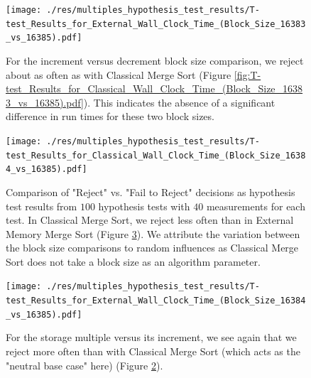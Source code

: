 \documentclass[twocolumn]{article}
\begin{document}
\begin{figure}[htb]
    \begin{minipage}{0.475 \textwidth}
        \centering
        \texttt{[image: ./res/multiples\_hypothesis\_test\_results/T-test\_Results\_for\_External\_Wall\_Clock\_Time\_(Block\_Size\_16383\_vs\_16385).pdf]}
        \caption{For the increment versus decrement block size comparison, we reject about as often as with Classical Merge Sort (Figure \ref{fig:T-test_Results_for_Classical_Wall_Clock_Time_(Block_Size_16383_vs_16385).pdf}). This indicates the absence of a significant difference in run times for these two block sizes.}
        \label{fig:T-test_Results_for_External_Wall_Clock_Time_(Block_Size_16383_vs_16385).pdf}
    \end{minipage}
\end{figure}

\begin{figure}[htb]
    \begin{minipage}{0.475 \textwidth}
        \centering
        \texttt{[image: ./res/multiples\_hypothesis\_test\_results/T-test\_Results\_for\_Classical\_Wall\_Clock\_Time\_(Block\_Size\_16384\_vs\_16385).pdf]}
        \caption{Comparison of "Reject" vs. "Fail to Reject" decisions as hypothesis test results from \( 100 \) hypothesis tests with \( 40 \) measurements for each test.
            In Classical Merge Sort, we reject less often than in External Memory Merge Sort (Figure \ref{fig:T-test_Results_for_External_Wall_Clock_Time_(Block_Size_16384_vs_16385).pdf}).
            We attribute the variation between the block size comparisons to random influences as Classical Merge Sort does not take a block size as an algorithm parameter.}
        \label{fig:T-test_Results_for_Classical_Wall_Clock_Time_(Block_Size_16384_vs_16385).pdf}
    \end{minipage}
\end{figure}

\begin{figure}[htb]
    \begin{minipage}{0.475 \textwidth}
        \centering
        \texttt{[image: ./res/multiples\_hypothesis\_test\_results/T-test\_Results\_for\_External\_Wall\_Clock\_Time\_(Block\_Size\_16384\_vs\_16385).pdf]}
        \caption{For the storage multiple versus its increment, we see again that we reject more often than with Classical Merge Sort (which acts as the "neutral base case" here) (Figure \ref{fig:T-test_Results_for_Classical_Wall_Clock_Time_(Block_Size_16384_vs_16385).pdf}).}
        \label{fig:T-test_Results_for_External_Wall_Clock_Time_(Block_Size_16384_vs_16385).pdf}
    \end{minipage}
\end{figure}
\end{document}
